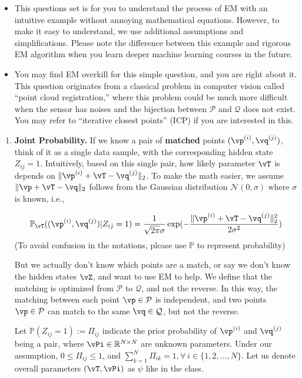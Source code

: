 \begin{Q}
\begin{itemize}[itemsep=-1mm]
    \item This questions set is for you to understand the process of EM with an intuitive example without annoying mathematical equations. However, to make it easy to understand, we use additional assumptions and simplifications. Please note the difference between this example and rigorous EM algorithm when you learn deeper machine learning courses in the future.
    \item You may find EM overkill for this simple question, and you are right about it. This question originates from a classical problem in computer vision called ``point cloud registration,'' where this problem could be much more difficult when the sensor has noises and the bijection between $\mathcal{P}$ and $\mathcal{Q}$ does not exist. You may refer to ``iterative closest points'' (ICP) if you are interested in this.
\end{itemize}

\begin{enumerate}

\item \textbf{Joint Probability.} 
If we know a pair of \textbf{matched} points $(\vp^{(i)}, \vq^{(j)})$, think of it as a single data sample, with the corresponding hidden state $Z_{ij}=1$. Intuitively, based on this single pair, how likely parameter $\vT$ is depends on $\|\vp^{(i)}+\vT-\vq^{(j)}\|_2$. To make the math easier, we assume $\|\vp+\vT-\vq\|_2$ follows from the Gaussian distribution $\mathcal{N}(0, \sigma)$ where $\sigma$ is known, i.e.,

\begin{equation}
    \mathbb{P}_{\vT}((\vp^{(i)}, \vq^{(j)})|Z_{ij}=1)=\frac{1}{\sqrt{2\pi} \sigma}\exp(-{\frac{\|\vp^{(i)}+\vT-\vq^{(j)}\|_2^2}{2\sigma^2}})
    \label{eq:em_gaussian}
\end{equation}
(To avoid confusion in the notations,  please use $\mathbb{P}$ to represent probability)

But we actually don't know which points are a match, or say we don't know the hidden states $\vZ$, and want to use EM to help. We define that the matching is optimized from $\mathcal{P}$ to $\mathcal{Q}$, and not the reverse. In this way, the matching between each point $\vp\in\mathcal{P}$ is independent, and two points $\vp\in\mathcal{P}$ can match to the same $\vq\in\mathcal{Q}$, but not the reverse.

Let $\mathbb{P}(Z_{ij}=1):=\Pi_{ij}$ indicate the prior probability of $\vp^{(i)}$ and $\vq^{(j)}$ being a pair, where $\vPi\in\mathbb{R}^{N\times N}$ are unknown parameters. Under our assumption, $0 \leq \Pi_{ij} \leq 1$, and $\sum_{k=1}^{N} \Pi_{ik}=1, \forall\ i\in\{1,2,...,N\}$. Let us denote overall parameters $(\vT, \vPi)$ as $\psi$ like in the class.


\end{enumerate}
\end{Q}
